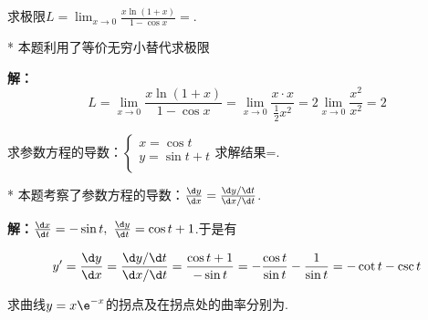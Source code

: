 \begin{problem}
    求极限$L=\lim_{x\to 0} \frac{x\ln (1+x)}{1-\cos x}=$.
\end{problem}

\begin{draft}
    \vspace{3em}
\end{draft}
\begin{solution}*
    本题利用了等价无穷小替代求极限

    \textbf{解：}
    \[L=\lim_{x\to 0} \frac{x\ln (1+x)}{1-\cos x}=\lim_{x\to 0} \frac{x\cdot x}{\frac{1}{2}x^2}=2\lim_{x\to 0} \frac{x^2}{x^2}=2\]
\end{solution}

\begin{problem}
    求参数方程的导数：$\begin{cases}
        x=\cos t\\
        y=\sin t+t\\
    \end{cases}$求解结果=.
\end{problem}
\begin{draft}
    \vspace{3em}
\end{draft}
\begin{solution}*
    本题考察了参数方程的导数：$\frac{\d y}{\d x}=\frac{\d y/\d t}{\d x/\d t}$.
    
    \textbf{解：}$\frac{\d x}{\d t}=-\sin t,\ \frac{\d y}{\d t}=\cos t+1$.于是有

    \[y'=\frac{\d y}{\d x}=\frac{\d y/\d t}{\d x/\d t}=\frac{\cos t+1}{-\sin t}=-\frac{\cos t}{\sin t}-\frac{1}{\sin t}=-\cot t-\csc t\]
\end{solution}


\begin{problem}
    求曲线$y=x\e^{-x}$的拐点及在拐点处的曲率分别为.
\end{problem}
\begin{draft}
    \vspace{3em}
\end{draft}

